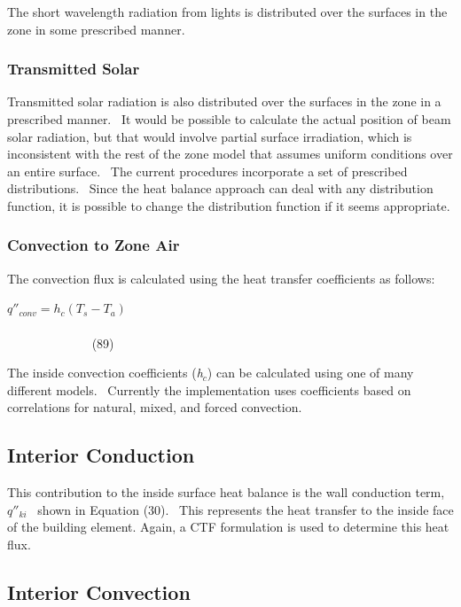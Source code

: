The short wavelength radiation from lights is distributed over the surfaces in the zone in some prescribed manner.

\subsubsection{Transmitted Solar}\label{transmitted-solar}

Transmitted solar radiation is also distributed over the surfaces in the zone in a prescribed manner.~ It would be possible to calculate the actual position of beam solar radiation, but that would involve partial surface irradiation, which is inconsistent with the rest of the zone model that assumes uniform conditions over an entire surface.~ The current procedures incorporate a set of prescribed distributions.~ Since the heat balance approach can deal with any distribution function, it is possible to change the distribution function if it seems appropriate.

\subsubsection{Convection to Zone Air}\label{convection-to-zone-air}

The convection flux is calculated using the heat transfer coefficients as follows:

\({q''_{conv}} = {h_c}({T_s} - {T_a})\) ~~~~~~~~~~~~~~~~~~~~~~~~~~~~~~~~~~~~~~~~~~~~~~~~~~~~~~~~~~~~~~~~~~~~~~~~~~~~~~~~~~~~~ (89)

The inside convection coefficients (\emph{h\(_{c}\)}) can be calculated using one of many different models.~ Currently the implementation uses coefficients based on correlations for natural, mixed, and forced convection.

\subsection{Interior Conduction}\label{interior-conduction}

This contribution to the inside surface heat balance is the wall conduction term, \({q''_{ki}}\) ~shown in Equation (30).~ This represents the heat transfer to the inside face of the building element. Again, a CTF formulation is used to determine this heat flux.

\subsection{Interior Convection}\label{interior-convection}


